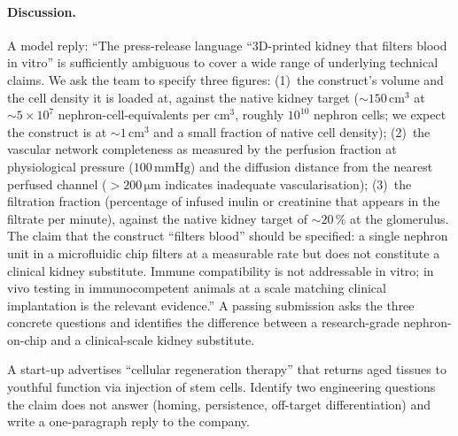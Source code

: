 \paragraph{Discussion.} A model reply: ``The press-release language
``3D-printed kidney that filters blood in vitro'' is sufficiently
ambiguous to cover a wide range of underlying technical claims. We
ask the team to specify three figures: (1)~the construct's volume
and the cell density it is loaded at, against the native kidney
target ($\sim 150\,\text{cm}^3$ at $\sim 5 \times 10^7$
nephron-cell-equivalents per $\text{cm}^3$, roughly $10^{10}$
nephron cells; we expect the construct is at $\sim 1\,\text{cm}^3$
and a small fraction of native cell density); (2)~the vascular
network completeness as measured by the perfusion fraction at
physiological pressure ($100\,\text{mmHg}$) and the diffusion
distance from the nearest perfused channel ($> 200\,\si{\micro\meter}$
indicates inadequate vascularisation); (3)~the filtration fraction
(percentage of infused inulin or creatinine that appears in the
filtrate per minute), against the native kidney target of $\sim
20\,\%$ at the glomerulus. The claim that the construct ``filters
blood'' should be specified: a single nephron unit in a microfluidic
chip filters at a measurable rate but does not constitute a
clinical kidney substitute. Immune compatibility is not addressable
in vitro; in vivo testing in immunocompetent animals at a scale
matching clinical implantation is the relevant evidence.''
A passing submission asks the three concrete questions and identifies
the difference between a research-grade nephron-on-chip and a
clinical-scale kidney substitute.

\begin{exercise}
A start-up advertises ``cellular regeneration therapy'' that returns
aged tissues to youthful function via injection of stem cells.
Identify two engineering questions the claim does not answer
(homing, persistence, off-target differentiation) and write a
one-paragraph reply to the company.
\end{exercise}

